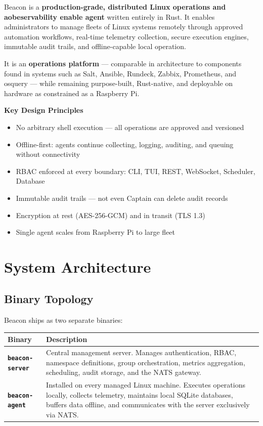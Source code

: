 \documentclass[12pt,a4paper]{article}
\begin{document}
Beacon is a \textbf{production-grade, distributed Linux operations and aobeservability enable agent } written entirely in Rust. It enables administrators to manage fleets of Linux systems remotely through approved automation workflows, real-time telemetry collection, secure execution engines, immutable audit trails, and offline-capable local operation.

It is an \textbf{operations platform} — comparable in architecture to components found in systems such as Salt, Ansible, Rundeck, Zabbix, Prometheus, and osquery — while remaining purpose-built, Rust-native, and deployable on hardware as constrained as a Raspberry Pi.

\begin{infobox}
\textbf{Key Design Principles}
\begin{itemize}[noitemsep]
    \item No arbitrary shell execution — all operations are approved and versioned
    \item Offline-first: agents continue collecting, logging, auditing, and queuing without connectivity
    \item RBAC enforced at every boundary: CLI, TUI, REST, WebSocket, Scheduler, Database
    \item Immutable audit trails — not even Captain can delete audit records
    \item Encryption at rest (AES-256-GCM) and in transit (TLS 1.3)
    \item Single agent scales from Raspberry Pi to large fleet
\end{itemize}
\end{infobox}

\section{System Architecture}

\subsection{Binary Topology}

Beacon ships as two separate binaries:

\begin{center}
\begin{tabularx}{0.85\textwidth}{>{\bfseries}lX}
\toprule
Binary & Description \\
\midrule
\texttt{beacon-server} & Central management server. Manages authentication, RBAC, namespace definitions, group orchestration, metrics aggregation, scheduling, audit storage, and the NATS gateway. \\[0.5em]
\texttt{beacon-agent}  & Installed on every managed Linux machine. Executes operations locally, collects telemetry, maintains local SQLite databases, buffers data offline, and communicates with the server exclusively via NATS. \\
\bottomrule
\end{tabularx}
\end{center}
\end{document}
